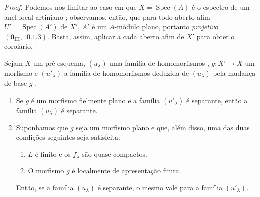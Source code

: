 \begin{proof}
Podemos nos limitar ao
caso em que
$X=\operatorname{Spec}(A)$
é o espectro de um
anel local artiniano
;
observamos, então,
que para todo aberto
afim
$U'=\operatorname{Spec}(A')$
de $X'$, $A'$ é um
$A$-módulo plano,
portanto \emph{projetivo}
$(\mathbf 0_{\mathrm{III}},
10.1.3)$. Basta,
assim, aplicar
a cada aberto afim de
$X'$ para obter o
corolário.
\end{proof}

\begin{theorem}[11.9.10]
\label{IV.11.9.10}
Sejam $X$ um pré-esquema,
$(u_\lambda)$ uma família
de homomorfismos
,
$g:X'\to X$ um morfismo
e $(u'_\lambda)$ a
família de homomorfismos
deduzida de
$(u_\lambda)$ pela
mudança de base $g$
.
\begin{enumerate}[label=(\roman*)]
  \item Se $g$ é um
  morfismo fielmente
  plano e a família
  $(u'_\lambda)$ é
  separante, então
  a família
  $(u_\lambda)$ é
  separante.
  \item Suponhamos que
  $g$ seja um morfismo
  plano e que, além
  disso, uma das duas
  condições seguintes
  seja satisfeita:
  \begin{enumerate}[label=\emph{\alph*)}]
    \item $L$ é finito
    e os $f_\lambda$
    são quase-compactos.
    \item O morfismo
    $g$ é localmente
    de apresentação
    finita.
  \end{enumerate}
  Então, se a família
  $(u_\lambda)$ é
  separante, o mesmo
  vale para a família
  $(u'_\lambda)$.
\end{enumerate}
\end{theorem}

